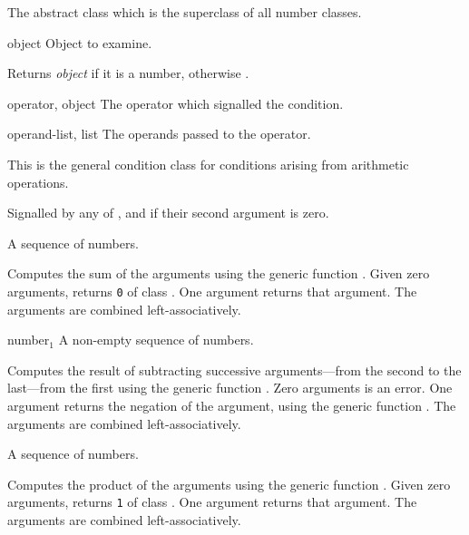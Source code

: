 \begin{optDefinition}
%
The abstract class which is the superclass of all number classes.

%
\begin{arguments}
    \item[object] Object to examine.
\end{arguments}
%
\result%
Returns {\em object\/} if it is a number, otherwise \nil.


\begin{initoptions}
    \item[operator, object] The operator which signalled the condition.
    \item[operand-list, list] The operands passed to the operator.
\end{initoptions}
%
\remarks%
This is the general condition class for conditions arising from arithmetic
operations.

%
Signalled by any of ,
 and  if
their second argument is zero.

\function{+}
%
\begin{arguments}
    \item[{\optional{number$_1$ number$_2$ ...}}] A sequence of numbers.
\end{arguments}
%
\result%
Computes the sum of the arguments using the generic function
.  Given zero arguments, \functionref{+} returns {\tt 0} of
class .  One argument returns that argument.  The arguments
are combined left-associatively.

\function{-}
%
\begin{arguments}
    \item[{number$_1$ \optional{number$_2$ ...}}] A non-empty sequence of
    numbers.
\end{arguments}
%
\result%
Computes the result of subtracting successive arguments---from the second to the
last---from the first using the generic function .  Zero
arguments is an error.  One argument returns the negation of the argument, using
the generic function .  The arguments are combined
left-associatively.

\function{*}
%
\begin{arguments}
    \item[{\optional{number$_1$ number$_2$ ...}}] A sequence of numbers.
\end{arguments}
%
\result%
Computes the product of the arguments using the generic function
.  Given zero arguments, \functionref{*} returns {\tt 1} of
class .  One argument returns that argument.  The arguments
are combined left-associatively.


\end{optDefinition}
